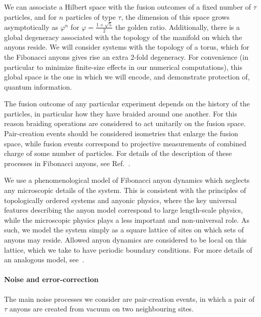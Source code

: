 \documentclass[aps, prl, letterpaper, twocolumn, superscriptaddress, notitlepage]{revtex4-1}
\begin{document}
We can associate a Hilbert space with the fusion outcomes of a fixed number of $\tau$ 
particles, and for $n$ particles of type $\tau$, the dimension of this space grows 
asymptotically as $\varphi^n$ for $\varphi=\frac{1+\sqrt{5}}{2}$ the golden ratio. Additionally, 
there is a global degeneracy associated with the topology of the manifold on which the 
anyons reside. We will consider systems with the topology of a torus, which for the Fibonacci 
anyons gives rise an extra 2-fold degeneracy. For convenience (in particular to minimize 
finite-size effects in our numerical computations), this global space is the one in which we will 
encode, and demonstrate protection of, quantum information.
	
The fusion outcome of any particular experiment depends on the history of the particles, in 
particular how they have braided around one another. For this reason braiding operations are 
considered to act unitarily on the fusion space. Pair-creation events should be considered 
isometries that enlarge the fusion space, while fusion events correspond to projective 
measurements of combined charge of some number of particles. For details of the description 
of these processes in Fibonacci anyons, see Ref.~\cite{Trebst2008}. 

We use a phenomenological model of Fibonacci anyon dynamics which neglects any 
microscopic details of the system. This is consistent with the principles of topologically 
ordered systems and anyonic physics, where the key universal features describing the anyon 
model correspond to large length-scale physics, while the microscopic physics plays a less 
important and non-universal role. As such, we model the system simply as a square lattice of 
sites on which sets of anyons may reside. Allowed anyon dynamics are considered to be local 
on this lattice, which we take to have periodic boundary conditions. For more details of an 
analogous model, see~\cite{Brell2013}.
	
\paragraph{Noise and error-correction}

The main noise processes we consider are pair-creation events, in which a pair of $\tau$ anyons are created from vacuum on two neighbouring sites.
\end{document}
